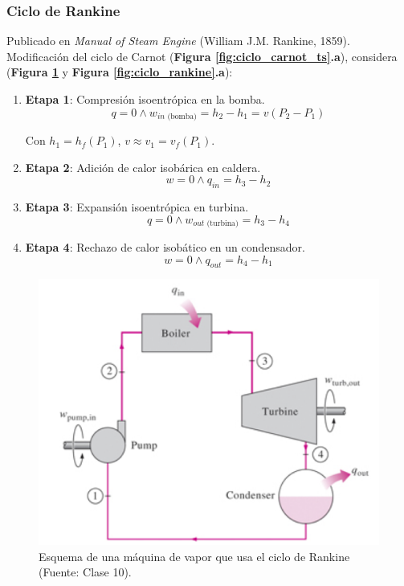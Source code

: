         \subsubsection{Ciclo de Rankine}
        
        Publicado en \textit{Manual of Steam Engine} (William J.M. Rankine, 1859). Modificación del ciclo de Carnot (\textbf{Figura \ref{fig:ciclo_carnot_ts}.a}), considera (\textbf{Figura \ref{fig:ciclo_rankine_esquema}} y \textbf{Figura \ref{fig:ciclo_rankine}.a}):
        \newpage
        
        \begin{multicols}{2}
            \begin{enumerate}
                \item \textbf{Etapa 1}: Compresión isoentrópica en la bomba.
                \[q = 0 \wedge w_{in \text{ (bomba)}} = h_{2} - h_{1} = v(P_{2} - P_{1})\]
                
                Con \(h_{1}=h_{f}(P_{1})\), \(v \approx v_{1} = v_{f}(P_{1})\).
                
                \item \textbf{Etapa 2}: Adición de calor isobárica en caldera.
                \[w = 0 \wedge q_{in} = h_{3} - h_{2}\]
                
                \item \textbf{Etapa 3}: Expansión isoentrópica en turbina.
                \[q = 0 \wedge w_{out \text{ (turbina)}} = h_{3} - h_{4}\]
                
                \item \textbf{Etapa 4}: Rechazo de calor isobático en un condensador.
                \[w = 0 \wedge q_{out} = h_{4} - h_{1}\]
            \end{enumerate}
            
            \begin{figure}
                \includegraphics[width=\textwidth]{img/clases/ciclo_rankine_esquema.png}
                \caption{Esquema de una máquina de vapor que usa el ciclo de Rankine (Fuente: Clase 10).}
                \label{fig:ciclo_rankine_esquema}
            \end{figure}
        \end{multicols}
        
